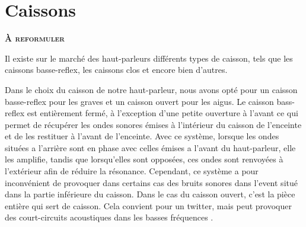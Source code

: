 \section{Caissons}

\textbf{\textsc{À reformuler}}

Il existe sur le marché des haut-parleurs
différents types de caisson, tels que
les caissons basse-reflex, les caissons clos et encore bien d’autres.

Dans le choix du caisson de notre haut-parleur,
nous avons opté pour un caisson basse-reflex pour les graves
et un caisson ouvert pour les aigus.
Le caisson bass-reflex est entièrement fermé, à l'exception d'une petite ouverture à l'avant ce qui permet de récupérer les ondes sonores émises à l'intérieur du caisson de l'enceinte et de les restituer à l'avant de l'enceinte.
Avec ce système, lorsque les ondes situées a l’arrière sont en phase
avec celles émises a l’avant du haut-parleur, elle les amplifie,
tandis que lorsqu’elles  sont opposées,
ces ondes sont renvoyées à l’extérieur afin de réduire la résonance\cite{US6275597}.
Cependant, ce système a pour inconvénient de provoquer dans certains cas
des bruits sonores dans l’event situé dans la partie inférieure du caisson.
Dans le cas du caisson ouvert, c'est la pièce entière qui sert de caisson. Cela convient pour un twitter, mais peut provoquer des court-circuits acoustiques dans les basses fréquences \cite{petoin}.